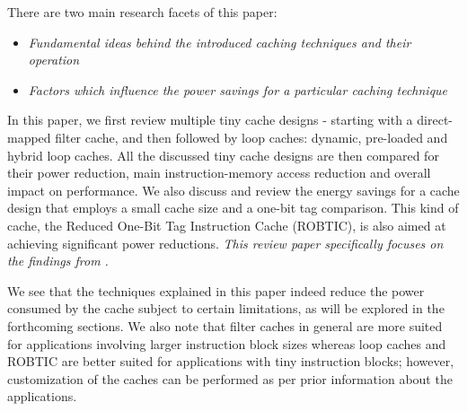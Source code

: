 \documentclass[conference]{IEEEtran}
\begin{document}
There are two main research facets of this paper:
\begin{itemize}
    \item \textit{Fundamental ideas behind the introduced caching techniques and their operation} 
    \item \textit{Factors which influence the power savings for a particular caching technique}
\end{itemize}

In this paper, we first review multiple tiny cache designs - starting with a direct-mapped filter cache, and then followed by loop caches: dynamic, pre-loaded and hybrid loop caches. All the discussed tiny cache designs are then compared for their power reduction, main instruction-memory access reduction and overall impact on performance. We also discuss and review the energy savings for a cache design that employs a small cache size and a one-bit tag comparison. This kind of cache, the Reduced One-Bit Tag Instruction Cache (ROBTIC), is also aimed at achieving significant power reductions. \textit{This review paper specifically focuses on the findings from \cite{1,fc1,robtic}.}

We see that the techniques explained in this paper indeed reduce the power consumed by the cache subject to certain limitations, as will be explored in the forthcoming sections. We also note that filter caches in general are more suited for applications involving larger instruction block sizes whereas loop caches and ROBTIC are better suited for applications with tiny instruction blocks; however, customization of the caches can be performed as per prior information about the applications.

\end{document}
